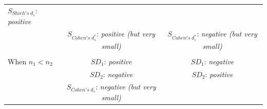 \documentclass[
  english,
  man]{apa6}
\begin{document}
\begin{longtable}[]{@{}lcc@{}}
\begin{minipage}[t]{0.35\columnwidth}
\(S_{Shieh's \; d_s}\): \emph{positive}\strut
\end{minipage}\tabularnewline
\begin{minipage}[t]{0.27\columnwidth}\raggedright
\strut
\end{minipage} & \begin{minipage}[t]{0.29\columnwidth}\centering
\(S_{Cohen's \; d^*_s}\): \emph{positive (but very small)}\strut
\end{minipage} & \begin{minipage}[t]{0.35\columnwidth}\centering
\(S_{Cohen's \; d^*_s}\): \emph{negative (but very small)}\strut
\end{minipage}\tabularnewline
\begin{minipage}[t]{0.27\columnwidth}\raggedright
\strut
\end{minipage} & \begin{minipage}[t]{0.29\columnwidth}\centering
\strut
\end{minipage} & \begin{minipage}[t]{0.35\columnwidth}\centering
\strut
\end{minipage}\tabularnewline
\begin{minipage}[t]{0.27\columnwidth}\raggedright
When \(n_1<n_2\)\strut
\end{minipage} & \begin{minipage}[t]{0.29\columnwidth}\centering
\(SD_1\): \emph{positive}\strut
\end{minipage} & \begin{minipage}[t]{0.35\columnwidth}\centering
\(SD_1\): \emph{negative}\strut
\end{minipage}\tabularnewline
\begin{minipage}[t]{0.27\columnwidth}\raggedright
\strut
\end{minipage} & \begin{minipage}[t]{0.29\columnwidth}\centering
\(SD_2\): \emph{negative}\strut
\end{minipage} & \begin{minipage}[t]{0.35\columnwidth}\centering
\(SD_2\): \emph{positive}\strut
\end{minipage}\tabularnewline
\begin{minipage}[t]{0.27\columnwidth}\raggedright
\strut
\end{minipage} & \begin{minipage}[t]{0.29\columnwidth}\centering
\(S_{Cohen's \; d_s}\): \emph{negative (but very small)}\strut
\end{minipage} & \begin{minipage}[t]{0.35\columnwidth}\centering

\end{minipage}
\end{longtable}
\end{document}
